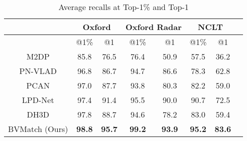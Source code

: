 \documentclass[letterpaper, 10 pt, journal, twoside]{IEEEtran}
\begin{document}
\begin{table}[!htb]
	\renewcommand\arraystretch{1.2}
	\renewcommand\tabcolsep{5pt}
	\newcommand{\tabincell}[2]{\begin{tabular}{@{}#1@{}}#2\end{tabular}}
	\begin{center}
		\caption{Average recalls at Top-1\% and Top-1}
		\label{table: top1}
		\begin{tabular}{|c|c|c|c|c|c|c|c|}
			\hline\hline
			& \multicolumn{2}{c|}{Oxford} & \multicolumn{2}{c|}{Oxford Radar} & \multicolumn{2}{c|}{NCLT} \\ \hline
			& @1\%        & @1       & @1\%           & @1       & @1\%           & @1     \\ \hline
			M2DP \cite{he2016m2dp}    &85.8   & 76.5                     &  76.4  &50.9               & 57.5          &    36.2                    \\ \hline
			PN-VLAD \cite{angelina2018pointnetvlad} &  96.8   & 86.7                     & 94.7            & 86.6          &    78.3     & 62.8                      \\ \hline
			PCAN \cite{zhang2019pcan} &  97.0   & 87.7                     & 93.8            & 80.3          &    82.2     & 59.0                      \\ \hline
			LPD-Net \cite{liu2019lpd} & 97.4      & 91.4                   & 95.5     &  90.0                 & 90.7     & 72.5                           \\ \hline
			DH3D \cite{du2020dh3d} &  97.8   & 88.7                     & 94.6            & 78.2          &    83.0     & 59.4                      \\ \hline
			BVMatch (Ours) & \textbf{98.8}      & \textbf{95.7}           & \textbf{99.2}      & \textbf{93.9}        & \textbf{95.2}         & \textbf{83.6}        \\ \hline
			\hline
		\end{tabular}
	\end{center}
\end{table}
\end{document}
